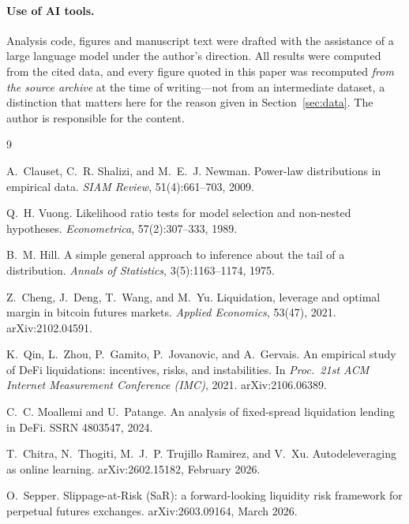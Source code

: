 \documentclass[11pt,a4paper]{article}
\begin{document}
\paragraph{Use of AI tools.} Analysis code, figures and manuscript text were drafted with the
assistance of a large language model under the author's direction. All results were computed from the
cited data, and every figure quoted in this paper was recomputed \emph{from the source archive}
at the time of writing---not from an intermediate dataset, a distinction that matters here for
the reason given in Section~\ref{sec:data}. The author is responsible for the content.

\begin{thebibliography}{9}

A.~Clauset, C.~R. Shalizi, and M.~E.~J. Newman.
\newblock Power-law distributions in empirical data.
\newblock \emph{SIAM Review}, 51(4):661--703, 2009.

Q.~H. Vuong.
\newblock Likelihood ratio tests for model selection and non-nested hypotheses.
\newblock \emph{Econometrica}, 57(2):307--333, 1989.

B.~M. Hill.
\newblock A simple general approach to inference about the tail of a distribution.
\newblock \emph{Annals of Statistics}, 3(5):1163--1174, 1975.

Z.~Cheng, J.~Deng, T.~Wang, and M.~Yu.
\newblock Liquidation, leverage and optimal margin in bitcoin futures markets.
\newblock \emph{Applied Economics}, 53(47), 2021. arXiv:2102.04591.

K.~Qin, L.~Zhou, P.~Gamito, P.~Jovanovic, and A.~Gervais.
\newblock An empirical study of DeFi liquidations: incentives, risks, and instabilities.
\newblock In \emph{Proc.\ 21st ACM Internet Measurement Conference (IMC)}, 2021.
arXiv:2106.06389.

C.~C. Moallemi and U.~Patange.
\newblock An analysis of fixed-spread liquidation lending in DeFi.
\newblock SSRN 4803547, 2024.

T.~Chitra, N.~Thogiti, M.~J.~P. Trujillo Ramirez, and V.~Xu.
\newblock Autodeleveraging as online learning.
\newblock arXiv:2602.15182, February 2026.

O.~Sepper.
\newblock Slippage-at-Risk (SaR): a forward-looking liquidity risk framework for perpetual
futures exchanges.
\newblock arXiv:2603.09164, March 2026.


\end{thebibliography}
\end{document}
